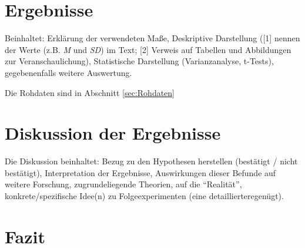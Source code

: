 \documentclass[11pt,a4paper,ngerman]{article}
\begin{document}
\section{Ergebnisse}
Beinhaltet: Erklärung der verwendeten Maße, Deskriptive Darstellung ([1] nennen der Werte (z.B. \textit{M} und \textit{SD}) im Text; [2] Verweis auf Tabellen und Abbildungen zur Veranschaulichung), Statistische Darstellung (Varianzanalyse, t-Tests), gegebenenfalls weitere Auswertung.

Die Rohdaten sind in Abschnitt \ref{sec:Rohdaten}


\section{Diskussion der Ergebnisse}
Die Diskussion beinhaltet: Bezug zu den Hypothesen herstellen (bestätigt / nicht bestätigt), Interpretation der Ergebnisse, Auswirkungen dieser Befunde auf weitere Forschung, zugrundeliegende Theorien, auf die "`Realität"', konkrete/spezifische Idee(n) zu Folgeexperimenten (eine detailliertere\linebreak genügt).

\section{Fazit}

\end{document}
